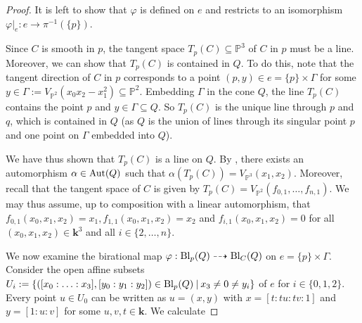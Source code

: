 \documentclass[english,11pt,reqno]{amsart}
\newcommand{\sub}{\subseteq}
\newcommand{\Ptwo}{\mathbb{P}^2}
\newcommand{\Pthree}{\mathbb{P}^3}
\newcommand{\VPtwo}{V_{\Ptwo}}
\newcommand{\VPthree}{V_{\Pthree}}
\newcommand{\kk}{\mathbf{k}}
\newcommand{\Bl}{\textup{Bl}}
\newcommand{\Aut}{\textup{Aut}}
\begin{document}
\begin{proof}
\noindent
\begin{minipage}[h]{\textwidth}
\vspace{0,5cm}
\centering
{}
\vspace{0,5cm}
\end{minipage}
It is left to show that $\varphi$ is defined on $e$ and restricts to an isomorphism $\varphi|_{e}: e \rightarrow \pi^{-1}(\{p\})$. \par 
Since $C$ is smooth in $p$, the tangent space $T_p(C)\sub \Pthree$ of $C$ in $p$ must be a line. Moreover, we can show that $T_p(C)$ is contained in $Q$. To do this, note that the tangent direction of $C$ in $p$ corresponds to a point $(p,y)\in e = \{p\} \times \Gamma$ for some $y\in\Gamma :=\VPtwo(x_0x_2-x_1^2)\sub \Ptwo$. Embedding $\Gamma$ in the cone $Q$, the line $T_p(C)$ contains the point $p$ and $y\in \Gamma \sub Q$. So $T_p(C)$ is the unique line through $p$ and $q$, which is contained in $Q$ (as $Q$ is the union of lines through its singular point $p$ and one point on $\Gamma$ embedded into $Q$). \par 
We have thus shown that $T_p(C)$ is a line on $Q$. By , there exists an automorphism $\alpha\in\Aut(Q)$ such that $\alpha(T_p(C))=\VPthree(x_1,x_2)$. Moreover, recall that the tangent space of $C$ is given by $T_p(C)=\VPtwo(f_{0,1},\dots,f_{n,1})$. We may thus assume, up to composition with a linear automorphism, that $f_{0,1}(x_0,x_1,x_2)=x_1, f_{1,1}(x_0,x_1,x_2)=x_2$ and $f_{i,1}(x_0,x_1,x_2)=0$ for all $(x_0,x_1,x_2)\in \kk^3$ and all $i\in\{2,\dots,n\}$.\par 
We now examine the birational map $\varphi:\Bl_p(Q)\dashrightarrow \Bl_C(Q)$ on $e=\{p\}\times \Gamma$. Consider the open affine subsets $U_i:=\{([x_0:{\dots}:x_3], [y_0:y_1:y_2])\in \Bl_p(Q) \: |\: x_3\neq 0\neq y_i\}$ of $e$ for $i\in\{0,1,2\}$. Every point $u\in U_0$ can be written as $u=(x, y)$ with $x=[t:tu:tv:1]$ and $y=[1:u:v]$ for some $u,v,t\in\kk$. We calculate

\end{proof}
\end{document}
